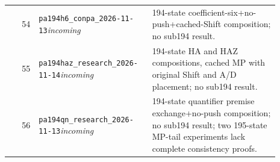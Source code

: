 \begin{longtable}{@{}rp{0.42\linewidth}p{0.47\linewidth}@{}}
54 & \nolinkurl{pa194h6_conpa_2026-11-13}\newline\emph{incoming} & 194-state coefficient-six+no-push+cached-Shift composition; no sub194 result. \\[2pt]
55 & \nolinkurl{pa194haz_research_2026-11-14}\newline\emph{incoming} & 194-state HA and HAZ compositions, cached MP with original Shift and A/D placement; no sub194 result. \\[2pt]
56 & \nolinkurl{pa194qn_research_2026-11-13}\newline\emph{incoming} & 194-state quantifier premise exchange+no-push composition; no sub194 result; two 195-state MP-tail experiments lack complete consistency proofs. \\[2pt]
\bottomrule\end{longtable}
\normalsize
